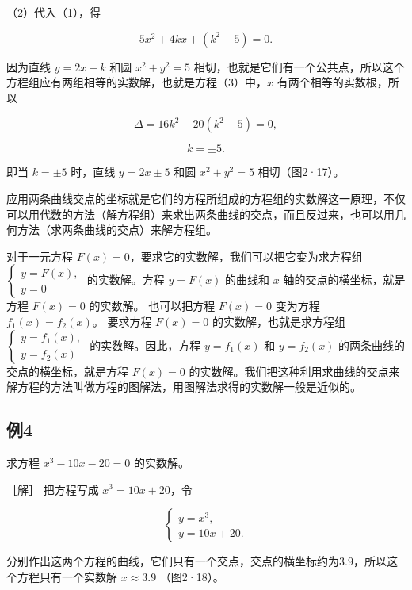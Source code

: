 （2）代入（1），得

\[
5 x^{2} + 4 k x + (k^{2} - 5) = 0. \tag {3}
\]

因为直线 \(y = 2x + k\) 和圆 \(x^{2} + y^{2} = 5\)
相切，也就是它们有一个公共点，所以这个方程组应有两组相等的实数解，也就是方程（3）中，\(x\)
有两个相等的实数根，所以

\[
\Delta = 16 k^{2} - 20 (k^{2} - 5) = 0,
\]

\[
k = \pm 5.
\]

即当 \(k = \pm 5\) 时，直线 \(y = 2x \pm 5\) 和圆 \(x^{2} + y^{2} = 5\)
相切（图2·17）。

应用两条曲线交点的坐标就是它们的方程所组成的方程组的实数解这一原理，不仅可以用代数的方法（解方程组）来求出两条曲线的交点，而且反过来，也可以用几何方法（求两条曲线的交点）来解方程组。

对于一元方程 \(F(x) = 0\)，要求它的实数解，我们可以把它变为求方程组
\(\left\{ \begin{array}{l} y = F(x), \\ y = 0 \end{array} \right.\)
的实数解。方程 \(y = F(x)\) 的曲线和 \(x\) 轴的交点的横坐标，就是方程
\(F(x) = 0\) 的实数解。 也可以把方程 \(F(x) = 0\) 变为方程
\(f_{1}(x) = f_{2}(x)\)。 要求方程 \(F(x) = 0\) 的实数解，也就是求方程组
\(\left\{ \begin{array}{l} y = f_1(x), \\ y = f_2(x) \end{array} \right.\)
的实数解。因此，方程 \(y = f_1(x)\) 和 \(y = f_2(x)\)
的两条曲线的交点的横坐标，就是方程 \(F(x) = 0\)
的实数解。我们把这种利用求曲线的交点来解方程的方法叫做方程的图解法，用图解法求得的实数解一般是近似的。

\subsection{例4}\label{ux4f8b4-3}

求方程 \(x^{3} - 10x - 20 = 0\) 的实数解。

［解］ 把方程写成 \(x^{3} = 10x + 20\)，令

\[
\left\{ \begin{array}{l} y = x^{3}, \\ y = 10 x + 20. \end{array} \right.
\]

分别作出这两个方程的曲线，它们只有一个交点，交点的横坐标约为3.9，所以这个方程只有一个实数解
\(x \approx 3.9\) （图2·18）。

